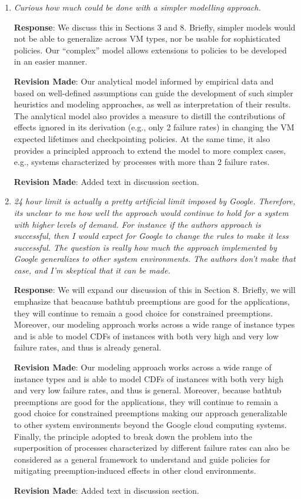 \documentclass{article}
\newcommand{\resp}[1]{\textbf{Response}: #1}
\newcommand{\revmade}[1]{\textbf{Revision Made}: #1}
\begin{document}
\begin{enumerate}

\item \emph{Curious how much could be done with a simpler modelling approach.}

\resp{We discuss this in Sections 3 and 8. Briefly, simpler models would not be able to generalize across VM types, nor be usable for sophisticated policies. Our ``complex'' model allows extensions to policies to be developed in an easier manner.}

\revmade{Our analytical model informed by empirical data and based on well-defined assumptions can guide the development of such simpler heuristics and modeling approaches, as well as interpretation of their results.
The analytical model also provides a measure to distill the contributions of effects ignored in its derivation (e.g., only 2 failure rates) in changing the VM expected lifetimes and checkpointing policies. At the same time, it also provides a principled approach to extend the model to more complex cases, e.g., systems characterized by processes with more than 2 failure rates.
}

\revmade{Added text in discussion section.}

\item \emph{24 hour limit is actually a pretty artificial limit imposed by Google. Therefore, its unclear to me how well the approach would continue to hold for a system with higher levels of demand. For instance if the authors approach is successful, then I would expect for Google to change the rules to make it less successful. The question is really how much the approach implemented by Google generalizes to other system environments. The authors don't make that case, and I'm skeptical that it can be made.}

\resp{We will expand our discussion of this in Section 8. Briefly, we will emphasize that  beacause bathtub preemptions are good for the applications, they will continue to remain a good choice for constrained preemptions. Moreover, our modeling approach works across a wide range of instance types and is able to model CDFs of instances with both very high and very low failure rates, and thus is already general. }

\revmade{Our modeling approach works across a wide range of instance types and is able to model CDFs of instances with both very high and very low failure rates, and thus is general. Moreover, because bathtub preemptions are good for the applications, they will continue to remain a good choice for constrained preemptions making our approach generalizable to other system environments beyond the Google cloud computing systems. Finally, the principle adopted to break down the problem into the superposition of processes characterized by different failure rates can also be considered as a general framework to understand and guide policies for mitigating preemption-induced effects in other cloud environments.}

\revmade{Added text in discussion section.}

\end{enumerate}
\end{document}
